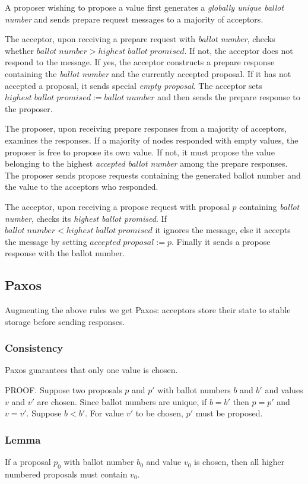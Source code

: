 \documentclass[12pt]{article}
\begin{document}
A proposer wishing to propose a value first generates a \emph{globally unique ballot number} and sends prepare request messages to a majority of acceptors.

The acceptor, upon receiving a prepare request with \emph{ballot number}, checks whether $ballot \; number > highest \; ballot \; promised$. If not, the acceptor does not respond to the message.
If yes, the acceptor constructs a prepare response containing the \emph{ballot number} and the currently accepted proposal. If it has not accepted a proposal, it sends special \emph{empty proposal}. The acceptor sets $highest \; ballot \; promised := ballot \; number$ and then sends the prepare response to the proposer.

The proposer, upon receiving prepare responses from a majority of acceptors, examines the responses. If a majority of nodes responded with empty values, the proposer is free to propose its own value. If not, it must propose the value belonging to the highest \emph{accepted ballot number} among the prepare responses. The proposer sends propose requests containing the generated ballot number and the value to the acceptors who responded.

The acceptor, upon receiving a propose request with proposal $p$ containing \emph{ballot number}, checks its \emph{highest ballot promised}. If $ballot \; number < highest \; ballot \; promised$ it ignores the message, else it accepts the message by setting
$accepted \; proposal := p$.
Finally it sends a propose response with the ballot number.

\subsection{ Paxos }

Augmenting the above rules we get Paxos: acceptors store their state to stable storage before sending responses.

\subsubsection{ Consistency } Paxos guarantees that only one value is chosen.

PROOF. Suppose two proposals $p$ and $p'$ with ballot numbers $b$ and $b'$ and values $v$ and $v'$ are chosen. Since ballot numbers are unique, if $b = b'$ then $p = p'$ and $v = v'$. Suppose $b < b'$. For value $v'$ to be chosen, $p'$ must be proposed.

\subsubsection{ Lemma } If a proposal $p_0$ with ballot number $b_0$ and value $v_0$ is chosen, then all higher numbered proposals must contain $v_0$.
\end{document}
